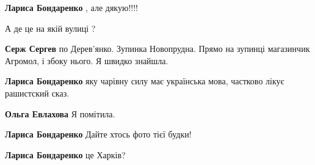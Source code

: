 \begin{itemize}
\begin{itemize}
\textbf{Лариса Бондаренко} , але дякую!!!!

 

А де це на якій вулиці ?

 
\textbf{Серж Сергев} по Дерев'янко. Зупинка Новопрудна. Прямо на зупинці магазинчик Агромол, і збоку нього. Я швидко знайшла.

 
\textbf{Лариса Бондаренко} яку чарівну силу має українська мова, частково лікує рашистский сказ.

 
\textbf{Ольга Евлахова} Я помітила.

 
\textbf{Лариса Бондаренко} Дайте хтось фото тієї будки!

 
\textbf{Лариса Бондаренко} це Харків?

 

\end{itemize}
\end{itemize}
